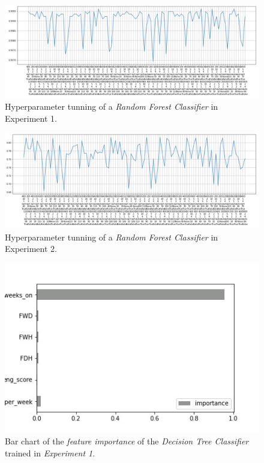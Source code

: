 \documentclass[sigplan,screen]{acmart}
\begin{document}
\begin{figure}[h]
    \centering
    \includegraphics[width=\linewidth]{reports/figures/random_forest_1.png}
    \caption{Hyperparameter tunning of a \emph{Random Forest Classifier} in Experiment 1.}
    \label{fig:hyp_forest_1}
\end{figure}

\begin{figure}[h]
    \centering
    \includegraphics[width=\linewidth]{reports/figures/random_forest_2.png}
    \caption{Hyperparameter tunning of a \emph{Random Forest Classifier} in Experiment 2.}
    \label{fig:hyp_forest_2}
\end{figure}

 \begin{figure}[h]
     \centering
     \includegraphics[width=0.5\linewidth]{reports/figures/feature_importance_dc_1.jpg}
     \caption{Bar chart of the \emph{feature importance} of the \emph{Decision Tree Classifier} trained in \emph{Experiment 1}.}
     \label{fig:fi_dc_1}
 \end{figure}
 
\end{document}
